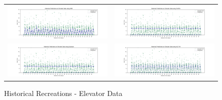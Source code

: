 \begin{figure}
  \begin{tabular}{cc}
    {\includegraphics[width = 3in]{images/results/Historical_elevator_DMM.png}} &
    {\includegraphics[width = 3in]{images/results/Historical_elevator_FreMEn.png}} \\
    {\includegraphics[width = 3in]{images/results/Historical_elevator_Gaussian.png}} &
    {\includegraphics[width = 3in]{images/results/Historical_elevator_HyT-EM.png}} \\
  \end{tabular}
  \caption{Historical Recreations - Elevator Data}
  \label{figure:Historical_Recreations_-_Elevator_Data}
\end{figure}

